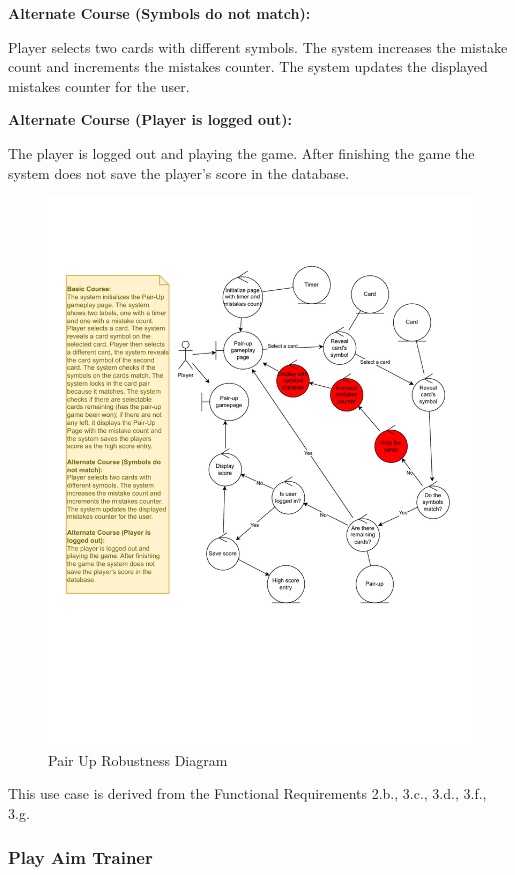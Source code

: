 \documentclass[11pt,a4paper]{article}
\newcommand{\heading}[1]{\vspace{1em}\noindent\textbf{#1}\par\vspace{0.5em}}
\begin{document}
\heading{Alternate Course (Symbols do not match):}
Player selects two cards with different symbols. The system increases the mistake count and increments the mistakes counter. The system updates the displayed mistakes counter for the user.

\heading{Alternate Course (Player is logged out):}
The player is logged out and playing the game. After finishing the game the system does not save the player's score in the database.

\begin{figure}[H]
    \centering
    \includegraphics[width=1\textwidth,keepaspectratio]{PSI_3rd_trial/robustness/pair_up.drawio.pdf}
    \caption{Pair Up Robustness Diagram}
    \label{fig:pair_up_robustness}
\end{figure}

This use case is derived from the Functional Requirements 2.b., 3.c., 3.d., 3.f., 3.g.

\subsubsection{Play Aim Trainer}
\end{document}
